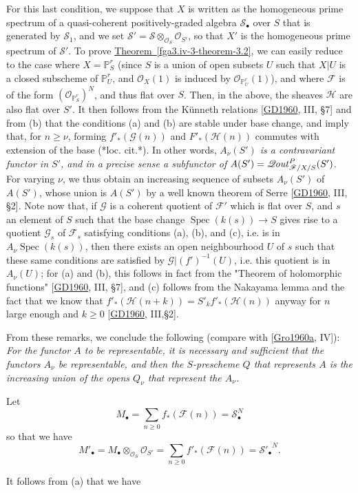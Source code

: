   For this last condition, we suppose that \(X\) is written as the homogeneous prime spectrum of a quasi-coherent positively-graded algebra \(\mathcal {S}_\bullet \) over \(S\) that is generated by \(\mathcal {S}_1\), and we set \(\mathcal {S}'=\mathcal {S}\otimes _{\mathcal {O}_S}\mathcal {O}_{S'}\), so that \(X'\) is the homogeneous prime spectrum of \(\mathcal {S}'\).
  To prove \hyperref[fga3.iv-3-theorem-3.2]{Theorem~\ref*{fga3.iv-3-theorem-3.2}}, we can easily reduce to the case where \(X=\mathbb {P}_S^r\) (since \(S\) is a union of open subsets \(U\) such that \(X|U\) is a closed subscheme of \(\mathbb {P}_U^r\), and \(\mathcal {O}_X(1)\) is induced by \(\mathcal {O}_{\mathbb {P}_U^r} (1)\)), and where \(\mathscr {F}\) is of the form \((\mathcal {O}_{\mathbb {P}_S^r})^N\), and thus flat over \(S\).
  Then, in the above, the sheaves \(\mathscr {H}\) are also flat over \(S'\).
  It then follows from the Künneth relations [\hyperref[GD1960]{GD1960}, III, §7] and from (b) that the conditions (a) and (b) are stable under base change, and imply that, for \(n\geqslant \nu \), forming \(f'_*(\mathscr {G} (n))\) and \(F'_*(\mathscr {H} (n))\) commutes with extension of the base (*loc. cit.*).
  In other words, \emph{\(A_\nu (S')\) is a contravariant functor in \(S'\), and in a precise sense a subfunctor of \(A(S')=\mathscr {Q}\kern  -.75pt\mathit {out}_{{\mathscr {F}/X/S}}^P(S')\)}.
  For varying \(\nu \), we thus obtain an increasing sequence of subsets \(A_\nu (S')\) of \(A(S')\), whose union is \(A(S')\) by a well known theorem of Serre [\hyperref[GD1960]{GD1960}, III, §2].
  Note now that, if \(\mathscr {G}\) is a coherent quotient of \(\mathscr {F}'\) which is flat over \(S\), and \(s\) an element of \(S\) such that the base change \(\operatorname {Spec}(k(s))\to  S\) gives rise to a quotient \(\mathscr {G}_s\) of \(\mathscr {F}_s\) satisfying conditions (a), (b), and (c), i.e. is in \(A_\nu \operatorname {Spec}(k(s))\), then there exists an open neighbourhood \(U\) of \(s\) such that these same conditions are satisfied by \(\mathscr {G}|(f')^{-1} (U)\), i.e. this quotient is in \(A_\nu (U)\);
  for (a) and (b), this follows in fact from the "Theorem of holomorphic functions" [\hyperref[GD1960]{GD1960}, III, §7], and (c) follows from the Nakayama lemma and the fact that we know that \(f'_*(\mathscr {H} (n+k))=S'_kf'_*(\mathscr {H} (n))\) anyway for \(n\) large enough and \(k\geqslant 0\) [\hyperref[GD1960]{GD1960}, III,§2].
  
  From these remarks, we conclude the following (compare with [\hyperref[Gro1960a]{Gro1960a}, IV]):
  \emph{For the functor \(A\) to be representable, it is necessary and sufficient that the functors \(A_\nu \) be representable, and then the \(S\)-prescheme \(Q\) that represents \(A\) is the increasing union of the opens \(Q_\nu \) that represent the \(A_\nu \).}\par{}Let
  \[     M_\bullet      = \sum _{n\geqslant 0} f_*(\mathscr {F} (n))     = \mathcal {S}_\bullet ^N   \]
  so that we have
  \[     M'_\bullet      = M_\bullet \otimes _{\mathcal {O}_S}\mathcal {O}_{S'}     = \sum _{n\geqslant 0} f'_*(\mathscr {F} (n))     = {\mathcal {S}'_\bullet }^N.   \]\par{}It follows from (a) that we have

